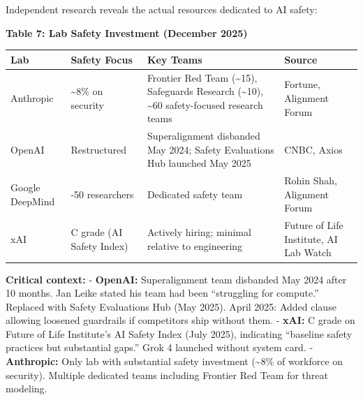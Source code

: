 \documentclass[
  11pt,
]{article}
\newcounter{none} %
\begin{document}
Independent research reveals the actual resources dedicated to AI
safety:

\textbf{Table 7: Lab Safety Investment (December 2025)}

{\def\LTcaptype{none} %
\begin{longtable}[]{@{}
  >{\raggedright\arraybackslash}p{}
  >{\raggedright\arraybackslash}p{}
  >{\raggedright\arraybackslash}p{}
  >{\raggedright\arraybackslash}p{}@{}}
\toprule\noalign{}
\begin{minipage}[b]{\linewidth}\raggedright
Lab
\end{minipage} & \begin{minipage}[b]{\linewidth}\raggedright
Safety Focus
\end{minipage} & \begin{minipage}[b]{\linewidth}\raggedright
Key Teams
\end{minipage} & \begin{minipage}[b]{\linewidth}\raggedright
Source
\end{minipage} \\
\midrule\noalign{}
\endhead
\bottomrule\noalign{}
\endlastfoot
Anthropic & \textasciitilde8\% on security & Frontier Red Team
(\textasciitilde15), Safeguards Research (\textasciitilde10),
\textasciitilde60 safety-focused research teams & Fortune, Alignment
Forum \\
OpenAI & Restructured & Superalignment disbanded May 2024; Safety
Evaluations Hub launched May 2025 & CNBC, Axios \\
Google DeepMind & 30-50 researchers & Dedicated safety team & Rohin
Shah, Alignment Forum \\
xAI & C grade (AI Safety Index) & Actively hiring; minimal relative to
engineering & Future of Life Institute, AI Lab Watch \\
\end{longtable}
}

\textbf{Critical context:} - \textbf{OpenAI:} Superalignment team
disbanded May 2024 after 10 months. Jan Leike stated his team had been
``struggling for compute.'' Replaced with Safety Evaluations Hub (May
2025). April 2025: Added clause allowing loosened guardrails if
competitors ship without them. - \textbf{xAI:} C grade on Future of Life
Institute's AI Safety Index (July 2025), indicating ``baseline safety
practices but substantial gaps.'' Grok 4 launched without system card. -
\textbf{Anthropic:} Only lab with substantial safety investment
(\textasciitilde8\% of workforce on security). Multiple dedicated teams
including Frontier Red Team for threat modeling.
\end{document}
